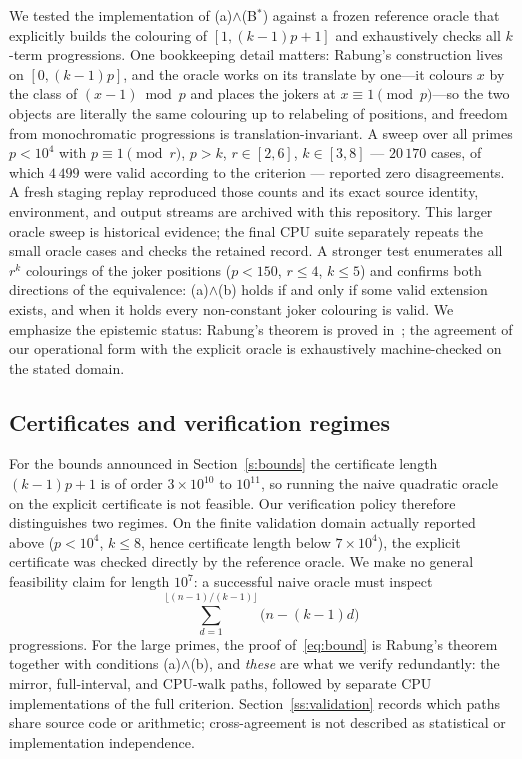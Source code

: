 We tested the implementation of (a)$\wedge$(B$^{*}$) against a frozen reference
oracle that explicitly builds the colouring of $[1,(k-1)p+1]$ and exhaustively
checks all $k$-term progressions. One bookkeeping detail matters: Rabung's
construction lives on $[0,(k-1)p]$, and the oracle works on its translate by
one---it colours $x$ by the class of $(x-1)\bmod p$ and places the jokers at
$x\equiv1\pmod p$---so the two objects are literally the same colouring up to
relabeling of positions, and freedom from monochromatic progressions is
translation-invariant. A sweep over all primes $p<10^{4}$ with
$p\equiv 1 \pmod r$, $p>k$, $r\in[2,6]$, $k\in[3,8]$ --- $20\,170$ cases, of
which $4\,499$ were valid according to the criterion --- reported zero
disagreements.  A fresh staging replay reproduced those counts and its exact
source identity, environment, and output streams are archived with this
repository. This larger oracle sweep is historical evidence; the final CPU
suite separately repeats the small oracle cases and checks the retained record. A
stronger test enumerates all $r^{k}$ colourings of the joker positions
($p<150$, $r\le 4$, $k\le 5$) and confirms both directions of the equivalence:
(a)$\wedge$(b) holds if and only if some valid extension exists, and when it
holds every non-constant joker colouring is valid. We emphasize the epistemic
status: Rabung's theorem is proved in~\cite{rabung1979}; the agreement of our
operational form with the explicit oracle is exhaustively machine-checked on
the stated domain.

\subsection{Certificates and verification regimes}\label{ss:certificates}

For the bounds announced in Section~\ref{s:bounds} the certificate length
$(k-1)p+1$ is of order $3\times 10^{10}$ to $10^{11}$, so running the naive
quadratic oracle on the explicit certificate is not feasible. Our verification
policy therefore distinguishes two regimes. On the finite validation domain
actually reported above ($p<10^4$, $k\le8$, hence certificate length below
$7\times10^4$), the explicit certificate was checked directly by the reference
oracle.  We make no general feasibility claim for length $10^7$: a successful
naive oracle must inspect
\[
 \sum_{d=1}^{\lfloor(n-1)/(k-1)\rfloor}
       \bigl(n-(k-1)d\bigr)
\]
progressions. For the large primes, the proof of~\eqref{eq:bound} is Rabung's
theorem together with conditions (a)$\wedge$(b), and \emph{these} are what we
verify redundantly: the mirror, full-interval, and CPU-walk paths, followed by
separate CPU implementations of the full criterion.
Section~\ref{ss:validation} records which paths share source code or
arithmetic; cross-agreement is not described as statistical or implementation
independence.

